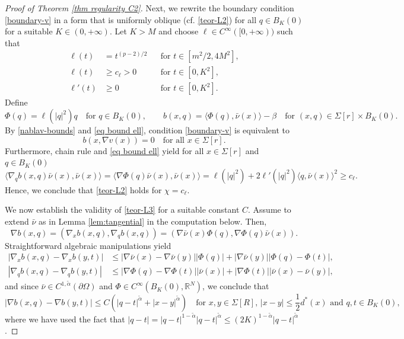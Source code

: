 \documentclass[10pt,a4paper]{amsart}
\numberwithin{equation}{section}
\newcommand{\R}{\mathbb{R}}
\begin{document}
\begin{proof}[Proof of Theorem \ref{thm regularity C2}]
Next, we rewrite the boundary condition \eqref{boundary-v} in a form that is uniformly oblique (cf. \eqref{teor-L2}) for all $q \in B_K(0)$ for a suitable $K \in (0,+\infty)$. Let $K>M$ and choose $\ell\in C^\infty([0,+\infty))$ such that
\begin{equation}\label{eq bound ell}
\begin{aligned}
    \ell(t)&=t^{(p-2)/2} &&\text{for }t\in[m^2/2,4M^2],\\
    \ell(t)&\ge c_\ell>0 &&\text{for }t\in[0,K^2],\\
    \ell'(t)&\ge0 &&\text{for }t\in[0,K^2].  
\end{aligned}    
\end{equation}
Define
\[
    \Phi(q)=\ell(|q|^2)q \quad \text{for } q \in B_K(0),\qquad b(x,q)=\langle \Phi(q),\bar{\nu}(x)\rangle-\beta \quad \text{for } (x,q) \in \Sigma[r] \times B_K(0).
\]
By \eqref{nablav-bounds} and \eqref{eq bound ell}, condition \eqref{boundary-v} is equivalent to
\begin{equation}\label{boundary-cond}
    b(x,\nabla v(x))=0 \quad\text{for all } x \in \Sigma[r].
\end{equation}
Furthermore, chain rule and \eqref{eq bound ell} yield for all $x \in \Sigma[r]$ and $q \in B_K(0)$
\[
    \langle \nabla_q b(x,q) \bar{\nu}(x), \bar{\nu}(x) \rangle
    =\langle \nabla \Phi(q)\bar{\nu}(x),\bar{\nu}(x)\rangle 
    =\ell(|q|^2)+2\ell'(|q|^2)\langle q,\bar{\nu}(x)\rangle^2
    \ge c_\ell.
\]
Hence, we conclude that \eqref{teor-L2} holds for $\chi = c_\ell$. 

We now establish the validity of \eqref{teor-L3} for a suitable constant $C$. Assume to extend $\bar{\nu}$ as in Lemma \ref{lem:tangential} in the computation below. Then,
\[
\nabla b(x,q) = \left(\nabla_x b(x,q) , \nabla_q b(x,q) \right) = \left( \nabla \bar{\nu} (x) \Phi(q) , \nabla \Phi(q) \bar{\nu}(x) \right).
\]
Straightforward algebraic manipulations yield
\begin{equation*}
\begin{split}
    |\nabla_x b(x,q) - \nabla_x b(y,t)| &\leq | \nabla \bar{\nu} (x) -  \nabla \bar{\nu} (y) | |\Phi(q)| + |\nabla \bar{\nu} (y) | |\Phi(q) - \Phi(t)|,
    \\
    |\nabla_q b(x,q) - \nabla_q b(y,t)| &\leq |\nabla \Phi(q) - \nabla \Phi(t)| |\bar{\nu}(x)| + |\nabla \Phi(t)| |\bar{\nu}(x) - \bar{\nu}(y)|,
\end{split}
\end{equation*}
and since $\bar{\nu} \in C^{1,\tilde{\alpha}}(\partial\Omega)$ and $\Phi\in C^\infty(B_K(0), \R^N)$, we conclude that 
\[
    |\nabla b(x,q)- \nabla b(y,t)| \le C\left(|q-t|^{\tilde{\alpha}} + |x-y|^{\tilde{\alpha}} \right) \quad \text{for } x,y \in \Sigma[R],\, |x-y| \le \frac{1}{2} d^\ast(x) \text{ and } q,t \in B_K(0),
\]
where we have used the fact that $|q-t| = |q-t|^{1-\tilde{\alpha}} |q-t|^{\tilde{\alpha}} \leq (2K)^{1-\tilde{\alpha}} |q-t|^{\tilde{\alpha}}$.


\end{proof}
\end{document}

